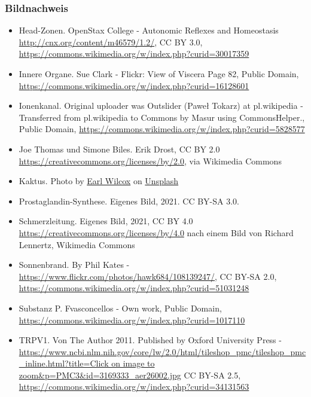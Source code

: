 \documentclass{beamer}
\begin{document}
\begin{frame}
 
\frametitle{Bildnachweis}
 
\begin{tiny}
  

\begin{itemize}
\item
Head-Zonen. OpenStax College - Autonomic Reflexes and Homeostasis  \url{http://cnx.org/content/m46579/1.2/}, CC BY 3.0, \url{https://commons.wikimedia.org/w/index.php?curid=30017359}
\item
Innere Organe.  Sue Clark - Flickr: View of Viscera Page 82, Public Domain, \url{https://commons.wikimedia.org/w/index.php?curid=16128601}
\item
Ionenkanal.  Original uploader was Outslider (Paweł Tokarz) at pl.wikipedia - Transferred from pl.wikipedia to Commons by Masur using CommonsHelper., Public Domain, \url{https://commons.wikimedia.org/w/index.php?curid=5828577}
\item
Joe Thomas und Simone Biles. Erik Drost, CC BY 2.0 \url{https://creativecommons.org/licenses/by/2.0}, via Wikimedia Commons
\item
Kaktus. Photo by \href{https://unsplash.com/@earl_plannerzone?utm_source=unsplash&utm_medium=referral&utm_content=creditCopyText}{Earl Wilcox} on \href{https://unsplash.com/s/photos/pain?utm_source=unsplash&utm_medium=referral&utm_content=creditCopyText}{Unsplash}
\item
Prostaglandin-Synthese. Eigenes Bild, 2021. CC BY-SA 3.0.
\item
Schmerzleitung. Eigenes Bild, 2021, CC BY 4.0 \url{https://creativecommons.org/licenses/by/4.0} nach einem Bild von Richard Lennertz,  Wikimedia Commons
\item
Sonnenbrand. By Phil Kates - \url{https://www.flickr.com/photos/hawk684/108139247/}, CC BY-SA 2.0, \url{https://commons.wikimedia.org/w/index.php?curid=51031248}
\item
Substanz P. Fvasconcellos - Own work, Public Domain, \url{https://commons.wikimedia.org/w/index.php?curid=1017110}
\item
TRPV1. Von The Author 2011. Published by Oxford University Press - \url{https://www.ncbi.nlm.nih.gov/core/lw/2.0/html/tileshop_pmc/tileshop_pmc_inline.html?title=Click on image to zoom&p=PMC3&id=3169333_aer26002.jpg}
CC BY-SA 2.5, \url{https://commons.wikimedia.org/w/index.php?curid=34131563}
\end{itemize}

\end{tiny}

\end{frame}
\end{document}
